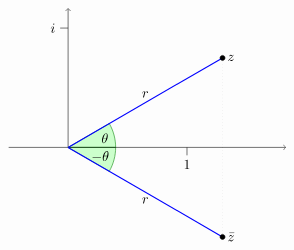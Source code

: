 \begin{equation*}
  \begin{tikzpicture}
    \draw[help lines, dotted] (30:4.5) -- (30:4.5 |- 0,0);
    \draw[help lines, dotted] (-30:4.5) -- (-30:4.5 |- 0,0);
    \filldraw[fill=green!20,draw=green!50!black] (0,0) -- (1.2,0) arc (0:30:1.2) -- cycle;
    \filldraw[fill=green!20,draw=green!50!black] (0,0) -- (1.2,0) arc (0:-30:1.2) -- cycle;
    \node at (15:9mm){$~\theta$};
    \node at (-15:9mm){$-\theta~$};
    \draw[->](-1.5,0) -- (5.5,0);
    \draw[->](0,0) -- (0,3.5);
    \draw(0,3) -- +(-0.2,0) node[left] {$i$};
    \draw(3,0) -- +(0,-0.2) node[below] {$1$};
    \draw[thick, blue] (0,0) -- node[above, black] {$r$} (30:4.5);
    \draw[fill, black] (30:4.5) circle [radius=1.8pt] node [right] {$z$};
    \draw[thick, blue] (0,0) -- node[below, black] {$r$} (-30:4.5);
    \draw[fill, black] (-30:4.5) circle [radius=1.8pt] node [right] {$\bar{z}$};
  \end{tikzpicture}
\end{equation*}

